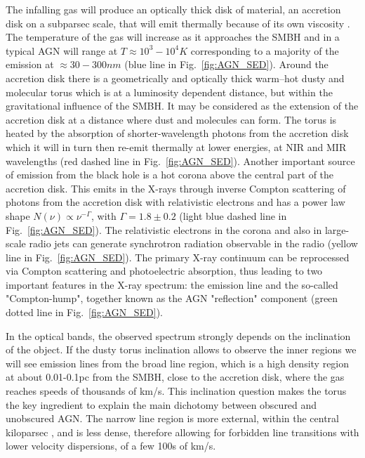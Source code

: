 The infalling gas will produce an optically thick disk of material, an accretion disk on a subparsec scale, that will emit thermally because of its own viscosity \citep[e.g.][]{1973A&A....24..337S, 1984ARA&A..22..471R}. The temperature of the gas will increase as it approaches the SMBH and in a typical AGN will range at $T \approx 10^3-10^4 K$ corresponding to a majority of the emission at $\approx 30-300 nm$ (blue line in Fig.~\ref{fig:AGN_SED}).
Around the accretion disk there is a geometrically and optically thick warm–hot dusty and molecular torus which is at a luminosity dependent distance, but within the gravitational influence of the SMBH. It may be considered as the extension of the accretion disk at a distance where dust and molecules can form. The torus is heated by the absorption of shorter-wavelength photons from the accretion disk which it will in turn then re-emit thermally at lower energies, at NIR and MIR wavelengths (red dashed line in Fig.~\ref{fig:AGN_SED}).
Another important source of emission from the black hole is a hot corona above the central part of the accretion disk. This emits in the X-rays through inverse Compton scattering of photons from the accretion disk with relativistic electrons and has a power law shape $N(\nu)\propto \nu^{-\Gamma}$, with $\Gamma=1.8\pm0.2$ (light blue dashed line in Fig.~\ref{fig:AGN_SED}). 
The relativistic electrons in the corona and also in large-scale radio jets can generate synchrotron radiation observable in the radio (yellow line in Fig.~\ref{fig:AGN_SED}).
The primary X-ray continuum can be reprocessed via Compton scattering and photoelectric absorption, thus leading to two important features in the X-ray spectrum: the \kalfa{} emission line and the so-called "Compton-hump", together known as the AGN "reflection" component (green dotted line in Fig.~\ref{fig:AGN_SED}).

In the optical bands, the observed spectrum strongly depends on the inclination of the object. If the dusty torus inclination allows to observe the inner regions we will see emission lines from the broad line region, which is a high density region at about 0.01-0.1pc from the SMBH, close to the accretion disk, where the gas reaches speeds of thousands of km/s. This inclination question makes the torus the key ingredient to explain the main dichotomy between obscured and unobscured AGN. The narrow line region is more external, within the central kiloparsec \citep[e.g.][]{2015MNRAS.454.4452H,2016MNRAS.460..130V}, and is less dense, therefore allowing for forbidden line transitions with lower velocity dispersions, of a few 100s of km/s.


